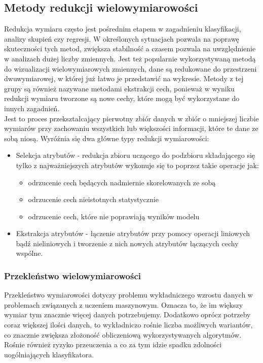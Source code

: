 \subsection{Metody redukcji wielowymiarowości}

Redukcja wymiaru często jest pośrednim etapem w zagadnieniu klasyfikacji, analizy skupień czy regresji. W określonych sytuacjach pozwala na poprawę skuteczności tych metod, zwiększa stabilność a czasem pozwala na uwzględnienie w analizach dużej liczby zmiennych. Jest też popularnie wykorzystywaną metodą do wizualizacji wielowymiarowych zmiennych, dane są redukowane do przestrzeni dwuwymiarowej, w której już łatwo je przedstawić na wykresie. Metody z tej grupy są również nazywane metodami ekstrakcji cech, ponieważ w wyniku redukcji wymiaru tworzone są nowe cechy, które mogą być wykorzystane do innych zagadnień. \\

Jest to proces przekształcający pierwotny zbiór danych w zbiór o mniejszej liczbie wymiarów
przy zachowaniu wszystkich lub większości informacji, które te dane ze sobą niosą. Wyróżnia
się dwa główne typy redukcji wymiarowości:

\begin{itemize}
	\item Selekcja atrybutów - redukcja zbioru uczącego do podzbioru składającego się tylko z najważniejszych atrybutów wykonuje się to poprzez takie operacje jak:
	\begin{itemize}
		\item odrzucenie cech będących nadmiernie skorelowanych ze sobą
		\item odrzucenie cech nieistotnych statystycznie
		\item odrzucenie cech, które nie poprawiają wyników modelu
	\end{itemize}
	\item Ekstrakcja atrybutów - łączenie atrybutów przy pomocy operacji liniowych bądź nieliniowych i tworzenie z nich nowych atrybutów łączących cechy wspólne.
\end{itemize}

\subsubsection{Przekleństwo wielowymiarowości}

Przekleństwo wymiarowości dotyczy problemu wykładniczego wzrostu danych w problemach związanych z uczeniem maszynowym. Oznacza to, że im większy wymiar tym znacznie więcej danych potrzebujemy. Dodatkowo oprócz potrzeby coraz większej ilości danych, to wykładniczo rośnie liczba możliwych wariantów, co znacznie zwiększa złożoność obliczeniową wykorzystywanych algorytmów. Rośnie również ryzyko przeuczenia a co za tym idzie spadku zdolności uogólniających klasyfikatora.

